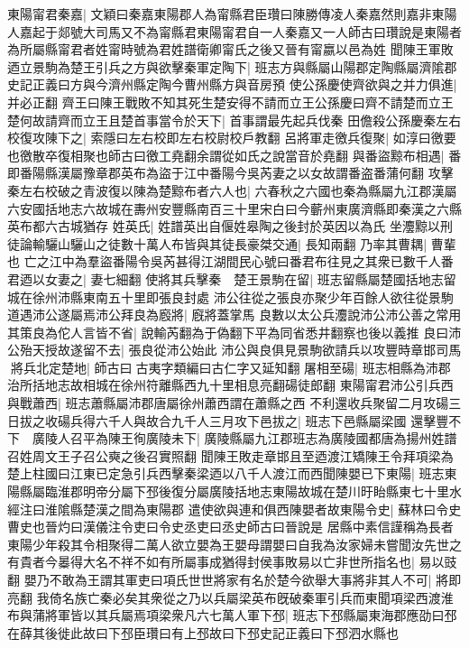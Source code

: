 東陽甯君秦嘉|{
	文穎曰秦嘉東陽郡人為甯縣君臣瓚曰陳勝傳凌人秦嘉然則嘉非東陽人嘉起于郯號大司馬又不為甯縣君東陽甯君自一人秦嘉又一人師古曰瓚說是東陽者為所屬縣甯君者姓甯時號為君姓譜衛卿甯氏之後又晉有甯嬴以邑為姓}
聞陳王軍敗迺立景駒為楚王引兵之方與欲擊秦軍定陶下|{
	班志方與縣屬山陽郡定陶縣屬濟隂郡史記正義曰方與今濟州縣定陶今曹州縣方與音房預}
使公孫慶使齊欲與之并力俱進|{
	并必正翻}
齊王曰陳王戰敗不知其死生楚安得不請而立王公孫慶曰齊不請楚而立王楚何故請齊而立王且楚首事當令於天下|{
	首事謂最先起兵伐秦}
田儋殺公孫慶秦左右校復攻陳下之|{
	索隱曰左右校即左右校尉校戶教翻}
呂將軍走徼兵復聚|{
	如淳曰徼要也徼散卒復相聚也師古曰徼工堯翻余謂從如氏之說當音於堯翻}
與番盜黥布相遇|{
	番即番陽縣漢屬豫章郡英布為盜于江中番陽今吳芮妻之以女故謂番盗番蒲何翻}
攻擊秦左右校破之青波復以陳為楚黥布者六人也|{
	六春秋之六國也秦為縣屬九江郡漢屬六安國括地志六故城在夀州安豐縣南百三十里宋白曰今蘄州東廣濟縣即秦漢之六縣英布都六古城猶存}
姓英氏|{
	姓譜英出自偃姓皋陶之後封於英因以為氏}
坐灋黥以刑徒論輸驪山驪山之徒數十萬人布皆與其徒長豪桀交通|{
	長知兩翻}
乃率其曹耦|{
	曹輩也}
亡之江中為羣盜番陽令吳芮甚得江湖間民心號曰番君布往見之其衆已數千人番君迺以女妻之|{
	妻七細翻}
使將其兵擊秦　楚王景駒在留|{
	班志留縣屬楚國括地志留城在徐州沛縣東南五十里即張良封處}
沛公往從之張良亦聚少年百餘人欲往從景駒道遇沛公遂屬焉沛公拜良為廏將|{
	廐將蓋掌馬}
良數以太公兵灋說沛公沛公善之常用其策良為佗人言皆不省|{
	說輸芮翻為于偽翻下平為同省悉井翻察也後以義推}
良曰沛公殆天授故遂留不去|{
	張良從沛公始此}
沛公與良俱見景駒欲請兵以攻豐時章邯司馬將兵北定楚地|{
	師古曰古夷字類編曰古仁字又延知翻}
屠相至碭|{
	班志相縣為沛郡治所括地志故相城在徐州符離縣西九十里相息亮翻碭徒郎翻}
東陽甯君沛公引兵西與戰蕭西|{
	班志蕭縣屬沛郡唐屬徐州蕭西謂在蕭縣之西}
不利還收兵聚留二月攻碭三日拔之收碭兵得六千人與故合九千人三月攻下邑拔之|{
	班志下邑縣屬梁國}
還擊豐不下　廣陵人召平為陳王徇廣陵未下|{
	廣陵縣屬九江郡班志為廣陵國都唐為揚州姓譜召姓周文王子召公奭之後召實照翻}
聞陳王敗走章邯且至迺渡江矯陳王令拜項梁為楚上柱國曰江東已定急引兵西擊秦梁迺以八千人渡江而西聞陳嬰已下東陽|{
	班志東陽縣屬臨淮郡明帝分屬下邳後復分屬廣陵括地志東陽故城在楚川旴眙縣東七十里水經注曰淮隂縣楚漢之間為東陽郡}
遣使欲與連和俱西陳嬰者故東陽令史|{
	蘇林曰令史曹史也晉灼曰漢儀注令吏曰令史丞吏曰丞史師古曰晉說是}
居縣中素信謹稱為長者東陽少年殺其令相聚得二萬人欲立嬰為王嬰母謂嬰曰自我為汝家婦未嘗聞汝先世之有貴者今㬥得大名不祥不如有所屬事成猶得封侯事敗易以亡非世所指名也|{
	易以豉翻}
嬰乃不敢為王謂其軍吏曰項氏世世將家有名於楚今欲舉大事將非其人不可|{
	將即亮翻}
我倚名族亡秦必矣其衆從之乃以兵屬梁英布旣破秦軍引兵而東聞項梁西渡淮布與蒲將軍皆以其兵屬焉項梁衆凡六七萬人軍下邳|{
	班志下邳縣屬東海郡應劭曰邳在薛其後徙此故曰下邳臣瓚曰有上邳故曰下邳史記正義曰下邳泗水縣也}
